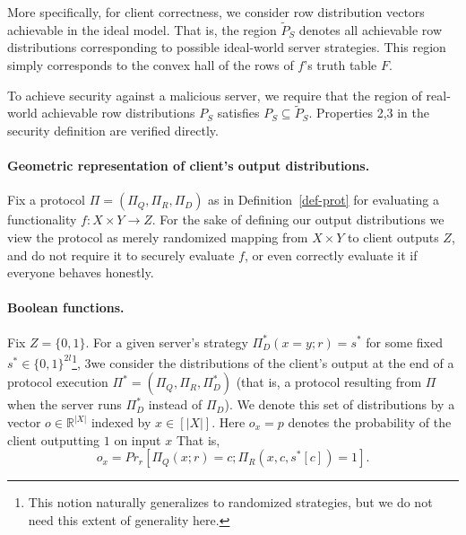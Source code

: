 \documentclass[a4paper]{article}
\newcommand{\R}{\mathbb{R}}
\begin{document}

More specifically, for client correctness, we consider row distribution vectors achievable 
in the ideal model. That is, the region $\tilde{P}_S$ denotes all achievable row distributions corresponding to possible ideal-world server strategies.
This region simply corresponds to the convex hall of the rows of $f$'s 
truth table $F$.


To achieve security against a malicious server, we require that
the region of real-world achievable row distributions $P_S$ satisfies
$P_S\subseteq \tilde{P}_S$.
Properties 2,3 in the security definition are verified directly.


\paragraph{Geometric representation of client's output distributions.}
Fix a protocol $\Pi=(\Pi_Q,\Pi_R,\Pi_D)$
as in Definition~\ref{def-prot} for evaluating a functionality $f:X\times Y\rightarrow Z$. For the sake of defining our output distributions we view the protocol as merely randomized mapping from $X\times Y$ to client outputs $Z$, and do not require it to securely evaluate $f$, or even correctly evaluate it if everyone behaves honestly.

\paragraph{Boolean functions.} Fix $Z=\{0,1\}$. For a given server's strategy $\Pi^*_D(x=y;r)=s^*$ for some fixed $s^*\in\{0,1\}^{2l}$\footnote{This notion naturally generalizes to randomized strategies, but we do not need this extent of generality here.}, 3we consider the distributions of the client's output at the end of a protocol execution $\Pi^*=(\Pi_Q,\Pi_R,\Pi^*_D)$ (that is, a protocol resulting from $\Pi$ when the server runs $\Pi^*_D$ instead of $\Pi_D$). We denote this set of distributions
by a vector $o\in \R^{|X|}$ indexed by $x\in [|X|]$. Here $o_x=p$ denotes the probability of the client outputting $1$ on input $x$
That is,
\[o_x = Pr_r[\Pi_Q(x;r)=c;\Pi_R(x,c,s^*[c])=1].\]
\end{document}
